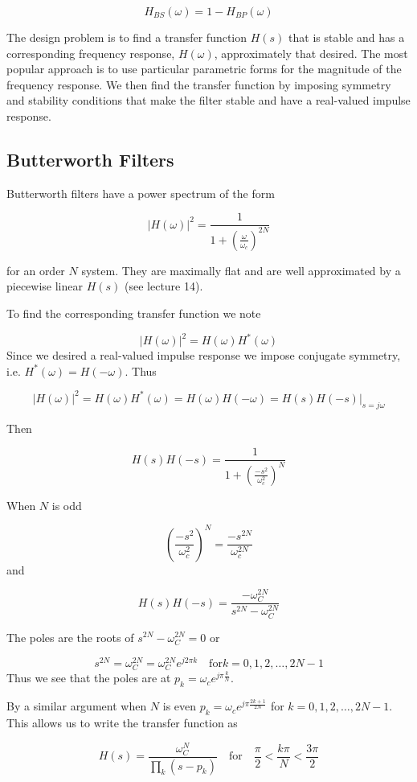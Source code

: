 \documentclass{article}
\begin{document}
\[
H_{BS}(\omega) = 1 - H_{BP}(\omega) 
\]

The design problem is to find a transfer function $H(s)$ that is stable and has a corresponding frequency response, $H(\omega)$, approximately that desired. The most popular approach is to use particular parametric forms for the magnitude of the frequency response. We then find the transfer function by imposing symmetry and stability conditions that make the filter stable and have a real-valued impulse response.

\subsection{Butterworth Filters}

Butterworth filters have a power spectrum of the form

\[
\left|H(\omega)\right|^2 = \frac{1}{1 + \left(\frac{\omega}{\omega_c}\right)^{2N}}
\]

for an order $N$ system. They are maximally flat and are well approximated by a piecewise linear $H(s)$ (see lecture 14).

To find the corresponding transfer function we note

\[
\left|H(\omega)\right|^2 = H(\omega)H^*(\omega)
\]
Since we desired a real-valued impulse response we impose conjugate symmetry, i.e. $H^*(\omega) = H(-\omega)$. Thus

\[
\left|H(\omega)\right|^2 = H(\omega)H^*(\omega) = H(\omega)H(-\omega) = \left. H(s)H(-s) \right|_{s = j\omega}
\]

Then

\[
H(s)H(-s) = \frac{1}{1 + \left(\frac{-s^2}{\omega_c^2}\right)^{N}}
\]

When $N$ is odd

\[
\left(\frac{-s^2}{\omega_c^2}\right)^{N} = \frac{-s^{2N}}{\omega_c^{2N}}
\]
and

\[
H(s)H(-s) = \frac{-\omega_C^{2N}}{s^{2N} - \omega_C^{2N}}
\]

The poles are the roots of $s^{2N} - \omega_C^{2N} = 0$ or

\[
s^{2N} = \omega_C^{2N} = \omega_C^{2N} e^{j2\pi k} \quad\text{for} k = 0,1,2,\ldots,2N-1
\]
Thus we see that the poles are at $p_k = \omega_c e^{j\pi \frac{k}{N}}$.

By a similar argument when $N$ is even $p_k = \omega_c e^{j\pi \frac{2k+1}{2N}}$ for $k = 0,1,2,\ldots,2N-1$. This allows us to write the transfer function as

\[
H(s) = \frac{\omega_C^N}{\prod\limits_{k} (s-p_k)} \quad\text{for}\quad \frac{\pi}{2} < \frac{k\pi}{N} < \frac{3\pi}{2}
\]
\end{document}
